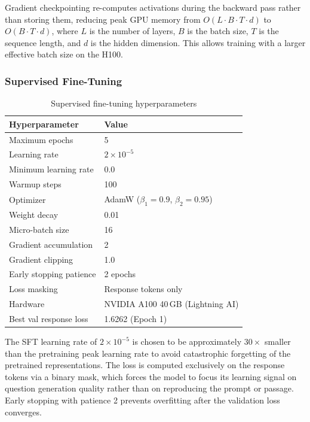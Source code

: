 \documentclass[12pt]{article}
\begin{document}
Gradient checkpointing re-computes activations during the backward pass rather than storing them, reducing peak GPU memory from $O(L \cdot B \cdot T \cdot d)$ to $O(B \cdot T \cdot d)$, where $L$ is the number of layers, $B$ is the batch size, $T$ is the sequence length, and $d$ is the hidden dimension. This allows training with a larger effective batch size on the H100.

\subsubsection{Supervised Fine-Tuning}

\begin{table}[H]
  \centering
  \caption{Supervised fine-tuning hyperparameters}
  \begin{tabular}{L{5.5cm} L{6.0cm}}
    \toprule
    \textbf{Hyperparameter} & \textbf{Value} \\
    \midrule
    Maximum epochs & 5 \\
    Learning rate & $2 \times 10^{-5}$ \\
    Minimum learning rate & 0.0 \\
    Warmup steps & 100 \\
    Optimizer & AdamW ($\beta_1=0.9$, $\beta_2=0.95$) \\
    Weight decay & 0.01 \\
    Micro-batch size & 16 \\
    Gradient accumulation & 2 \\
    Gradient clipping & 1.0 \\
    Early stopping patience & 2 epochs \\
    Loss masking & Response tokens only \\
    Hardware & NVIDIA A100 40\,GB (Lightning AI) \\
    Best val response loss & 1.6262 (Epoch 1) \\
    \bottomrule
  \end{tabular}
  \label{tab:sft_hparams}
\end{table}

The SFT learning rate of $2 \times 10^{-5}$ is chosen to be approximately $30\times$ smaller than the pretraining peak learning rate to avoid catastrophic forgetting of the pretrained representations. The loss is computed exclusively on the response tokens via a binary mask, which forces the model to focus its learning signal on question generation quality rather than on reproducing the prompt or passage. Early stopping with patience 2 prevents overfitting after the validation loss converges.
\end{document}

